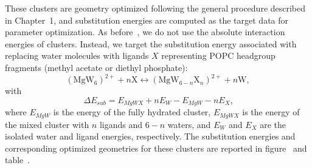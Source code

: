 These clusters are geometry optimized following the general procedure
described in Chapter~1, and substitution energies are computed as the
target data for parameter optimization. As before~\cite{saunders:2022},
we do not use the absolute interaction energies of \mg{} clusters. Instead,
we target the substitution energy associated with replacing water molecules
with ligands $X$ representing POPC headgroup fragments (methyl acetate or
diethyl phosphate):
\begin{equation}
(\mathrm{Mg} \mathrm{W}_{6})^{2+} + n\mathrm{X} \longleftrightarrow (\mathrm{Mg} \mathrm{W}_{6-n} \mathrm{X}_n)^{2+} + n\mathrm{W},
\end{equation}
with
\begin{equation}
\Delta E_{sub} = E_{MgWX} + nE_{W} - E_{MgW} - nE_{X}\text{,}
\label{equ_2}
\end{equation}
where $E_{MgW}$ is the energy of the fully hydrated \mg{} cluster,
$E_{MgWX}$ is the energy of the mixed cluster with $n$ ligands and $6-n$
waters, and $E_W$ and $E_X$ are the isolated water and ligand energies,
respectively. The substitution energies and corresponding optimized
geometries for these clusters are reported in figure~\label{figch4:optres} and table~\label{tabch4:subenergies}.


